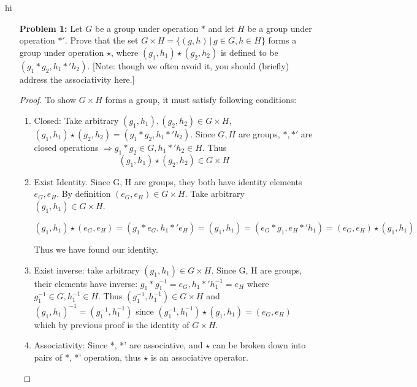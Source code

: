 \documentclass[11pt, oneside]{article}
\begin{document}
\thispagestyle{empty}

hi 
\newpage

\begin{enumerate}


\item[{\bf Problem 1:}] Let $G$ be a group under operation $*$ and let $H$ be a group under operation $*'$. Prove that the set $G\times H=\{(g,h) \, | \, g\in G, h\in H\}$ forms a group under operation $\star$, where $(g_1,h_1)\star (g_2,h_2)$ is defined to be $(g_1*g_2, h_1*'h_2)$. [Note: though we often avoid it, you should (briefly) address the associativity here.]

\begin{proof}
To show $G\times H$ forms a group, it must satisfy following conditions:
\begin{enumerate}
    \item Closed: Take arbitrary $(g_1,h_1), (g_2,h_2) \in G\times H$, $(g_1,h_1)\star (g_2,h_2)=(g_1*g_2, h_1*'h_2)$. Since $G, H$ are groups, $*, *'$ are closed operations $\Rightarrow{}g_1*g_2\in G, h_1*'h_2\in H $. Thus
    \[(g_1,h_1)\star (g_2,h_2) \in G\times H\]
    
    \item Exist Identity. Since G, H are groups, they both have identity elements $e_G, e_H$. By definition $(e_G, e_H) \in G\times H$. Take arbitrary $(g_1,h_1) \in G\times H$. 
    
    \[(g_1,h_1) \star (e_G, e_H)= (g_1 *e_G, h_1*'e_H )= (g_1,h_1)=(e_G *g_1, e_H*'h_1 ) =(e_G, e_H)\star  (g_1,h_1) 
    \]
    
    
    Thus we have found our identity.
    
    \item Exist inverse: take arbitrary $(g_1,h_1) \in G\times H$. Since G, H are groups, their elements have inverse: $g_1 * g_1^{-1}= e_G, h_1*'h_1^{-1}=e_H$ where $g_1^{-1}\in G,h_1^{-1}\in H$. Thus $(g_1^{-1}, h_1^{-1})\in G\times H$ and $(g_1,h_1)^{-1} =(g_1^{-1}, h_1^{-1})$ since $(g_1^{-1}, h_1^{-1}) \star (g_1,h_1) = (e_G, e_H)$ which by previous proof is the identity of $G\times H$.
    
    \item Associativity: Since *, *' are associative, and $\star$ can be broken down into pairs of *, *' operation, thus $\star$ is an associative operator.
\end{enumerate}
\end{proof}


\end{enumerate}
\end{document}
